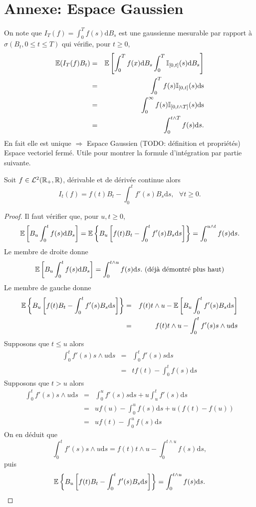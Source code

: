 \section{Annexe: Espace Gaussien}
On note que $I_T(f) = \int_0^T f(s)\text{d}B_s$ est une \va gaussienne mesurable par rapport à $\sigma(B_t,0\leq t\leq T)$ qui vérifie, pour $t\geq 0$,
\begin{eqnarray*}
\mathbb{E}(I_T(f)B_t)& =& \mathbb{E}\left[\int_0^T f(x)\text{d}B_s\int_0^T \mathbb{I}_{[0,t]}(s)\text{d}B_s\right]\\
&=&\int_0^Tf(s)\mathbb{I}_{[0,t]}(s)\text{ds}\\ 
&=&\int_0^\infty f(s)\mathbb{I}_{[0,t\land T]}(s)\text{ds}\\
&=& \int_0^{t\land T} f(s)\text{d}s.
\end{eqnarray*}
En fait elle est unique $\Rightarrow$ Espace Gaussien (TODO: définition et propriétés) Espace vectoriel fermé. Utile pour montrer la formule d'intégration par partie suivante.
\begin{theo}
Soit $f\in \mathcal{L}^2(\mathbb{R}_+,\mathbb{R})$, dérivable et de dérivée continue alors 
$$
I_t(f) = f(t)B_t - \int_0^tf'(s)B_s\text{d}s,\text{ }\forall t\geq 0.
$$
\end{theo}
\begin{proof}
Il faut vérifier que, pour $u, t\geq 0$, 
\begin{equation}\label{eq:identity_wiener_integral}
\mathbb{E}\left[B_u\int_0^tf(s)\text{d}B_s\right] = \mathbb{E}\left\{B_u\left[f(t)B_t - \int_0^tf'(s)B_s\text{d}s\right]\right\} = \int_0^{u\land t}f(s)\text{d}s.
\end{equation}
Le membre de droite donne
$$
\mathbb{E}\left[B_u\int_0^tf(s)\text{d}B_s\right] = \int_0^{t\land u}f(s)\text{d}s.\text{ (déjà démontré plus haut)}
$$
Le membre de gauche donne
\begin{eqnarray*}
\mathbb{E}\left\{B_u\left[f(t)B_t - \int_0^tf'(s)B_s\text{d}s\right]\right\}&=&f(t) t\land u - \mathbb{E}\left[B_u\int_0^tf'(s)B_s\text{d}s\right]\\
&=&f(t) t\land u - \int_0^tf'(s)s\land u\text{d}s\\
\end{eqnarray*}
Supposons que $t \leq u$ alors 
\begin{eqnarray*}
\int_0^tf'(s)s\land u\text{d}s&=& \int_0^tf'(s)s\text{d}s \\
&=& tf(t) - \int_{0}^tf(s)\text{d}s
\end{eqnarray*}
Supposons que $t> u$ alors
\begin{eqnarray*}
\int_0^tf'(s)s\land u\text{d}s&=& \int_0^uf'(s)s\text{d}s + u\int_u^tf'(s)\text{d}s\\
&=&uf(u) - \int_{0}^uf(s)\text{d}s + u(f(t)- f(u))\\
&=&uf(t) - \int_{0}^uf(s)\text{d}s 
\end{eqnarray*}
On en déduit que 
$$
\int_0^tf'(s)s\land u\text{d}s = f(t)t\land u - \int^{t\land u}_0f(s)\text{d}s,
$$
puis 
$$
\mathbb{E}\left\{B_u\left[f(t)B_t - \int_0^tf'(s)B_s\text{d}s\right]\right\} = \int^{t\land u}_0f(s)\text{d}s.
$$

\end{proof}
